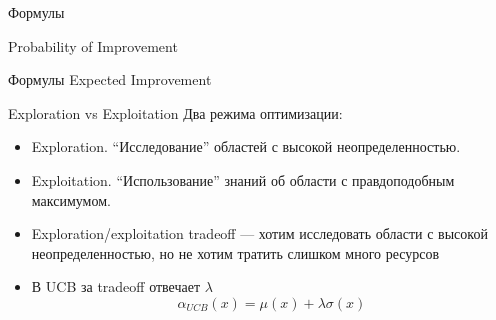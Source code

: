 \documentclass[fullscreen=true, bookmarks=true, hyperref={pdfencoding=unicode}]{beamer}
\begin{document}
\begin{frame}{Формулы}

    Probability of Improvement
    \<
         
    \>
\end{frame}

\begin{frame}{Формулы}
    Expected Improvement
    \<
        \\
    \>
\end{frame}

\begin{frame}{Exploration vs Exploitation}
    Два режима оптимизации:
    \begin{itemize}
        \item<1-> Exploration. ``Исследование'' областей с высокой неопределенностью.
        \item<2-> Exploitation. ``Использование'' знаний об области с правдоподобным максимумом.
        \item<3-> Exploration/exploitation tradeoff --- хотим исследовать области с высокой неопределенностью, но не хотим тратить слишком много ресурсов
        \item<4-> В UCB за tradeoff отвечает $\lambda$
        \[
            \alpha_{UCB}(x) = \mu(x) + \lambda \sigma(x)
        \]
    \end{itemize}
\end{frame}
\end{document}
